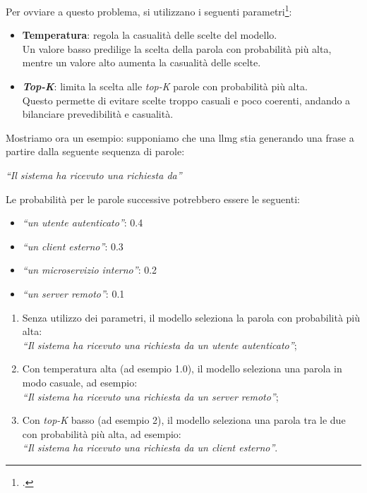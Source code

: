\noindent Per ovviare a questo problema, si utilizzano i seguenti parametri\footcite{site:mediun-llm-parameters}:
\begin{itemize}
    \item \textbf{Temperatura}: regola la casualità delle scelte del modello. \\
    Un valore basso predilige la scelta della parola con probabilità più alta, mentre un valore alto aumenta la casualità delle scelte.
    \item \textbf{\textit{Top-K}}: limita la scelta alle \textit{top-K} parole con probabilità più alta.\\
    Questo permette di evitare scelte troppo casuali e poco coerenti, andando a bilanciare prevedibilità e casualità.\\
\end{itemize}

\noindent Mostriamo ora un esempio: supponiamo che una \gls{llmg} stia generando una frase a partire dalla seguente sequenza di parole: 
\begin{center}
    \textit{``Il sistema ha ricevuto una richiesta da''}\\
\end{center}

Le probabilità per le parole successive potrebbero essere le seguenti:
\begin{itemize}
    \item \textit{``un utente autenticato''}: 0.4
    \item \textit{``un client esterno''}: 0.3
    \item \textit{``un microservizio interno''}: 0.2
    \item \textit{``un server remoto''}: 0.1
\end{itemize}
\pagebreak
\begin{enumerate}
    \item Senza utilizzo dei parametri, il modello seleziona la parola con probabilità più alta: \\
    \textit{``Il sistema ha ricevuto una richiesta da un utente autenticato''};
    \item Con temperatura alta (ad esempio 1.0), il modello seleziona una parola in modo casuale, ad esempio: \\
    \textit{``Il sistema ha ricevuto una richiesta da un server remoto''};
    \item Con \textit{top-K} basso (ad esempio 2), il modello seleziona una parola tra le due con probabilità più alta, ad esempio: \\
    \textit{``Il sistema ha ricevuto una richiesta da un client esterno''}.
\end{enumerate}

